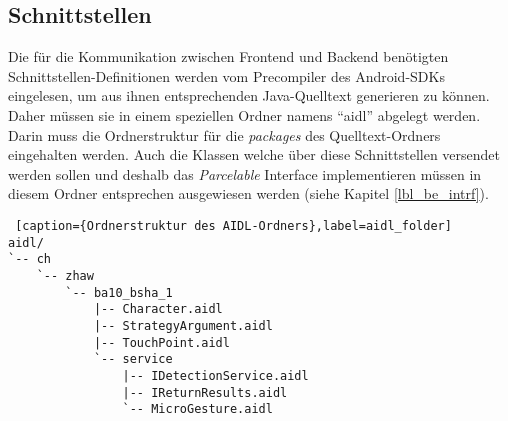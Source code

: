 \subsection{Schnittstellen}

Die für die Kommunikation zwischen Frontend und Backend benötigten Schnittstellen-Definitionen werden vom Precompiler des Android-SDKs eingelesen, um aus ihnen entsprechenden Java-Quelltext generieren zu können. Daher müssen sie in einem speziellen Ordner namens ``aidl'' abgelegt werden. Darin muss die Ordnerstruktur für die \emph{packages} des Quelltext-Ordners eingehalten werden. Auch die Klassen welche über diese Schnittstellen versendet werden sollen und deshalb das \emph{Parcelable} Interface implementieren müssen in diesem Ordner entsprechen ausgewiesen werden (siehe Kapitel \ref{lbl_be_intrf}).

\begin{lstlisting} [caption={Ordnerstruktur des AIDL-Ordners},label=aidl_folder]
aidl/
`-- ch
    `-- zhaw
        `-- ba10_bsha_1
            |-- Character.aidl
            |-- StrategyArgument.aidl
            |-- TouchPoint.aidl
            `-- service
                |-- IDetectionService.aidl
                |-- IReturnResults.aidl
                `-- MicroGesture.aidl
\end{lstlisting}
